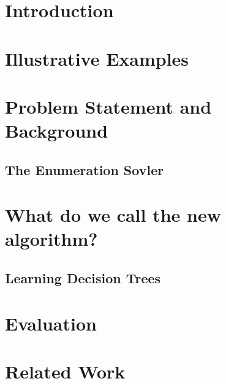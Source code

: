 \documentclass{llncs}
\begin{document}
\section{Introduction}
\label{sec:intro}

\section{Illustrative Examples}
\label{sec:example}

\section{Problem Statement and Background}
\label{sec:problem}

\subsection{The Enumeration Sovler }
\label{sec:enumeration}

\section{What do we call the new algorithm?}
\label{sec:algo}

\subsection{Learning Decision Trees}
\label{sec:decision_trees}

\section{Evaluation}
\label{sec:evaluation}

\section{Related Work}
\label{sec:related_work}

\
\end{document}
